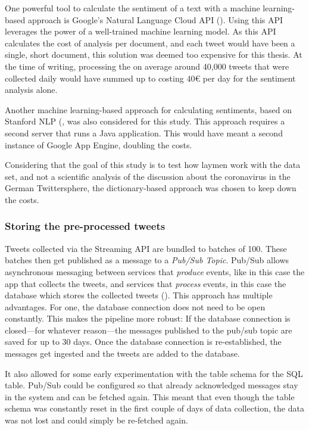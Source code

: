 One powerful tool to calculate the sentiment of a text with a machine learning-based approach is Google's Natural Language Cloud API (\cite{googleSentimentAnalysisTutorial2020}). Using this API leverages the power of a well-trained machine learning model. As this API calculates the cost of analysis per document, and each tweet would have been a single, short document, this solution was deemed too expensive for this thesis. At the time of writing, processing the on average around 40,000 tweets that were collected daily would have summed up to costing 40€ per day for the sentiment analysis alone.

Another machine learning-based approach for calculating sentiments, based on Stanford NLP (\cite{stanfordnaturallanguageprocessinggroupSoftwareStanfordNatural}, was also considered for this study. This approach requires a second server that runs a Java application. This would have meant a second instance of Google App Engine, doubling the costs.

Considering that the goal of this study is to test how laymen work with the data set, and not a scientific analysis of the discussion about the coronavirus in the German Twittersphere, the dictionary-based approach was chosen to keep down the costs. %

\subsubsection{Storing the pre-processed tweets}\label{sec:storage}
Tweets collected via the Streaming API are bundled to batches of 100. These batches then get published as a message to a \emph{Pub/Sub Topic}. Pub/Sub allows asynchronous messaging between services that \emph{produce} events, like in this case the app that collects the tweets, and services that \emph{process} events, in this case the database which stores the collected tweets (\cite{googleWhatPubSub2020}).
This approach has multiple advantages. For one, the database connection does not need to be open constantly. This makes the pipeline more robust: If the database connection is closed---for whatever reason---the messages published to the pub/sub topic are saved for up to 30 days. Once the database connection is re-established, the messages get ingested and the tweets are added to the database.

It also allowed for some early experimentation with the table schema for the SQL table. Pub/Sub could be configured so that already acknowledged messages stay in the system and can be fetched again. This meant that even though the table schema was constantly reset in the first couple of days of data collection, the data was not lost and could simply be re-fetched again.

